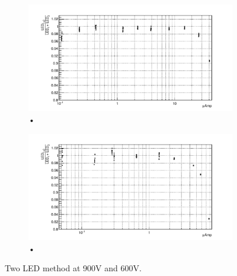 \begin{figure}
\centering
\begin{subfigure}[b]{\textwidth}
\includegraphics[width=\textwidth]{chapters/graphs/PMTchar/PMT900V_linearity2LEDmethod.pdf}
\caption{•}
\end{subfigure}
\begin{subfigure}[b]{\textwidth}
\includegraphics[width=\textwidth]{chapters/graphs/PMTchar/PMT600V_linearity2LEDmethod.pdf}
\caption{•}
\end{subfigure}
\caption{Two LED method at 900V and 600V.}
\end{figure}